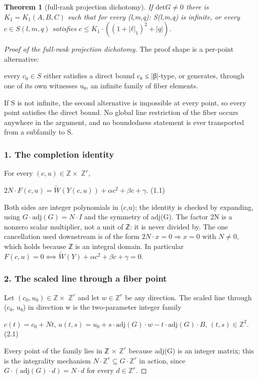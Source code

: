 \documentclass[11pt]{article}
\theoremstyle{plain}
\theoremstyle{definition}
\theoremstyle{remark}
\theoremstyle{plain}
\newtheorem*{theorem*}{Theorem}
\theoremstyle{definition}
\theoremstyle{remark}
\theoremstyle{plain}
\theoremstyle{definition}
\theoremstyle{remark}
\begin{document}
\begin{theorem*}[full-rank projection dichotomy]
If $\mathrm{det} G ≠ 0$ there is $K_{1} = K_{1}(A,B,C)$ such that for every (l,m,q): S(l,m,q) is infinite, or every $c ∈ S(l,m,q)$ satisfies $c ≤ K_{1}·((1+|ℓ|_{1})^{2}+|q|)$.

\end{theorem*}
\begin{proof}[Proof of the full-rank projection dichotomy]
The proof shape is a per-point alternative:

every $c_{0} ∈ S$ either satisfies a direct bound c₀ ≤ |β|-type,   or generates, through one of its own witnesses u₀, an infinite   family of fiber elements.

If S is not infinite, the second alternative is impossible at every point, so every point satisfies the direct bound. No global line restriction of the fiber occurs anywhere in the argument, and no boundedness statement is ever transported from a subfamily to S.

\subsubsection*{1. The completion identity}
For every $(c,u) ∈ ℤ ×$ $ℤ^{r}$,

$2N·F(c,u) = \tilde{W}(Y(c,u)) + α c^{2} + β c + γ$.                        (1.1)

Both sides are integer polynomials in (c,u); the identity is checked by expanding, using $G·\mathrm{adj}(G) = N·I$ and the symmetry of adj(G). The factor 2N is a nonzero scalar multiplier, not a unit of ℤ: it is never divided by. The one cancellation used downstream is of the form $2N·x = 0 ⇒ x = 0$ with $N ≠ 0$, which holds because ℤ is an integral domain. In particular $F(c,u) = 0 ⟺ \tilde{W}(Y) + αc^{2} + βc + γ = 0$.

\subsubsection*{2. The scaled line through a fiber point}
Let $(c_{0}, u_{0}) ∈ ℤ ×$ $ℤ^{r}$ and let $w ∈ ℤ^{r}$ be any direction. The scaled line through (c₀, u₀) in direction w is the two-parameter integer family

$c(t) = c_{0} + N t$,   $u(t,s) = u_{0} + s·\mathrm{adj}(G)·w − t·\mathrm{adj}(G)·B$,          $(t,s) ∈ ℤ^{2}$.      (2.1)

Every point of the family lies in ℤ × $ℤ^{r}$ because adj(G) is an integer matrix; this is the integrality mechanism $N·ℤ^{r} ⊆ G·ℤ^{r}$ in action, since $G·(\mathrm{adj}(G)·d) = N·d$ for every $d ∈ ℤ^{r}$.


\end{proof}
\end{document}
